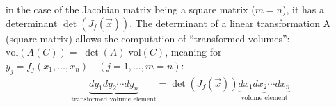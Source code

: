 in the case of the Jacobian matrix being a square matrix ($m=n$), it has a determinant $\det(J_f(\vec{x}))$.
The determinant of a linear transformation A (square matrix) allows the computation of ``transformed volumes'':
$\mathrm{vol}(A(C))=|\det(A)|\mathrm{vol}(C)$, meaning for $y_j = f_j(x_1,\ldots,x_n)\quad(j=1,...,m=n)$:
\begin{align*}
    \underbrace{dy_1dy_2\cdots dy_n}_\text{transformed volume element} = \det(J_f(\vec{x}))
    \underbrace{dx_1dx_2\cdots dx_n}_\text{volume element}
\end{align*}


